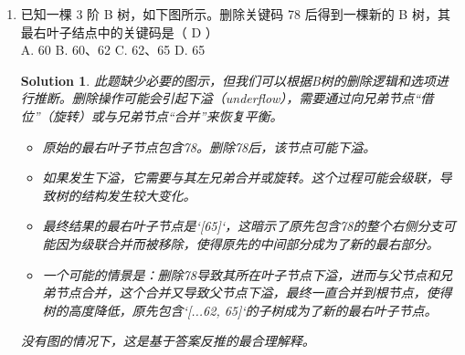 \documentclass[UTF8]{report}
\newtheorem{solution}{Solution}
\theoremstyle{MyLineTheoremStyle} %
\theoremstyle{MyBlockTheoremStyle} %
\theoremstyle{MySubsubsectionStyle} %
\begin{document}
\begin{enumerate}
    \item 已知一棵 3 阶 B 树，如下图所示。删除关键码 78 后得到一棵新的 B 树，其最右叶子结点中的关键码是（ D ）\\
    A. 60 \quad B. 60、62 \quad C. 62、65 \quad D. 65
    \begin{solution}
        此题缺少必要的图示，但我们可以根据B树的删除逻辑和选项进行推断。删除操作可能会引起下溢（underflow），需要通过向兄弟节点“借位”（旋转）或与兄弟节点“合并”来恢复平衡。
        \begin{itemize}
            \item 原始的最右叶子节点包含78。删除78后，该节点可能下溢。
            \item 如果发生下溢，它需要与其左兄弟合并或旋转。这个过程可能会级联，导致树的结构发生较大变化。
            \item 最终结果的最右叶子节点是`[65]`，这暗示了原先包含78的整个右侧分支可能因为级联合并而被移除，使得原先的中间部分成为了新的最右部分。
            \item 一个可能的情景是：删除78导致其所在叶子节点下溢，进而与父节点和兄弟节点合并，这个合并又导致父节点下溢，最终一直合并到根节点，使得树的高度降低，原先包含`[...62, 65]`的子树成为了新的最右叶子节点。
        \end{itemize}
        没有图的情况下，这是基于答案反推的最合理解释。
    \end{solution}


\end{enumerate}
\end{document}
